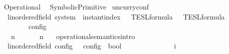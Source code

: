 %
\begin{isabellebody}%
%
%
\isadelimdocument
%
\endisadelimdocument
%
\isatagdocument
%
\isamarkuptrue%
%
\endisatagdocument
{\isafolddocument}%
%
\isadelimdocument
%
\endisadelimdocument
%
\begin{isamarkuptext}%
\label{chap:operational_semantics}%
\end{isamarkuptext}\isamarkuptrue%
%
\isadelimtheory
%
\endisadelimtheory
%
\isatagtheory
{}\isamarkupfalse%
\ Operational\isanewline
{}\isanewline
\ \ SymbolicPrimitive\isanewline
\isanewline
{}%
\endisatagtheory
{\isafoldtheory}%
%
\isadelimtheory
%
\endisadelimtheory
%
\isadelimdocument
%
\endisadelimdocument
%
\isatagdocument
%
\isamarkuptrue%
%
\endisatagdocument
{\isafolddocument}%
%
\isadelimdocument
%
\endisadelimdocument
{}\isamarkupfalse%
\ uncurry{\isacharunderscore}conf\isanewline
\ \ {\isacharcolon}{\isacharcolon}{\isacartoucheopen}{\isacharparenleft}{\isacharprime}{\isasymtau}{\isacharcolon}{\isacharcolon}linordered{\isacharunderscore}field{\isacharparenright}\ system\ {\isasymRightarrow}\ instant{\isacharunderscore}index\ {\isasymRightarrow}\ {\isacharprime}{\isasymtau}\ TESL{\isacharunderscore}formula\ {\isasymRightarrow}\ {\isacharprime}{\isasymtau}\ TESL{\isacharunderscore}formula\isanewline
\ \ \ \ \ \ {\isasymRightarrow}\ {\isacharprime}{\isasymtau}\ config{\isacartoucheclose}\ \ \ \ \ \ \ \ \ \ \ \ \ \ \ \ \ \ \ \ \ \ \ \ \ \ \ \ \ \ \ \ \ \ \ \ \ \ \ \ \ \ \ \ \ \ \ \ \ \ {\isacharparenleft}{\isachardoublequoteopen}{\isacharunderscore}{\isacharcomma}\ {\isacharunderscore}\ {\isasymturnstile}\ {\isacharunderscore}\ {\isasymtriangleright}\ {\isacharunderscore}{\isachardoublequoteclose}\ {}{}{\isacharparenright}\isanewline
{}\isanewline
\ \ {\isacartoucheopen}{\isasymGamma}{\isacharcomma}\ n\ {\isasymturnstile}\ {\isasymPsi}\ {\isasymtriangleright}\ {\isasymPhi}\ {\isasymequiv}\ {\isacharparenleft}{\isasymGamma}{\isacharcomma}\ n{\isacharcomma}\ {\isasymPsi}{\isacharcomma}\ {\isasymPhi}{\isacharparenright}{\isacartoucheclose}\isanewline
\isanewline
{}\isamarkupfalse%
\ operational{\isacharunderscore}semantics{\isacharunderscore}intro\isanewline
\ \ {\isacharcolon}{\isacharcolon}{\isacartoucheopen}{\isacharparenleft}{\isacharprime}{\isasymtau}{\isacharcolon}{\isacharcolon}linordered{\isacharunderscore}field{\isacharparenright}\ config\ {\isasymRightarrow}\ {\isacharprime}{\isasymtau}\ config\ {\isasymRightarrow}\ bool{\isacartoucheclose}\ \ \ \ \ \ \ \ \ \ \ \ \ \ {\isacharparenleft}{\isachardoublequoteopen}{\isacharunderscore}\ {\isasymhookrightarrow}\isactrlsub i\ {\isacharunderscore}{\isachardoublequoteclose}\ {}{}{\isacharparenright}\isanewline

\end{isabellebody}
